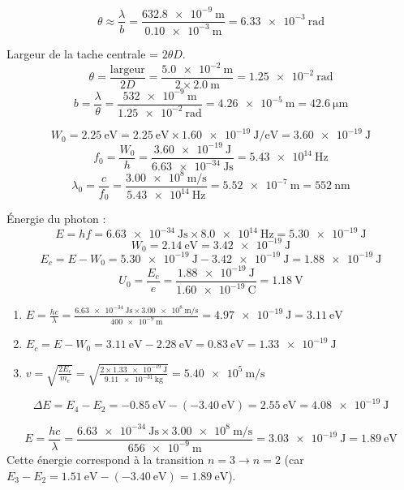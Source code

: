 \[
\theta \approx \frac{\lambda}{b} = \frac{\SI{632.8e-9}{\metre}}{\SI{0.10e-3}{\metre}} = \SI{6.33e-3}{\radian}
\]

Largeur de la tache centrale = \(2 \theta D\).
\[
\theta = \frac{\text{largeur}}{2 D} = \frac{\SI{5.0e-2}{\metre}}{2 \times \SI{2.0}{\metre}} = \SI{1.25e-2}{\radian}
\]
\[
b = \frac{\lambda}{\theta} = \frac{\SI{532e-9}{\metre}}{\SI{1.25e-2}{\radian}} = \SI{4.26e-5}{\metre} = \SI{42.6}{\micro\metre}
\]

\[
W_0 = \SI{2.25}{\electronvolt} = \SI{2.25}{\electronvolt} \times \SI{1.60e-19}{\joule\per\electronvolt} = \SI{3.60e-19}{\joule}
\]
\[
f_0 = \frac{W_0}{h} = \frac{\SI{3.60e-19}{\joule}}{\SI{6.63e-34}{\joule\second}} = \SI{5.43e14}{\hertz}
\]
\[
\lambda_0 = \frac{c}{f_0} = \frac{\SI{3.00e8}{\metre\per\second}}{\SI{5.43e14}{\hertz}} = \SI{5.52e-7}{\metre} = \SI{552}{\nano\metre}
\]

Énergie du photon :
\[
E = h f = \SI{6.63e-34}{\joule\second} \times \SI{8.0e14}{\hertz} = \SI{5.30e-19}{\joule}
\]
\[
W_0 = \SI{2.14}{\electronvolt} = \SI{3.42e-19}{\joule}
\]
\[
E_c = E - W_0 = \SI{5.30e-19}{\joule} - \SI{3.42e-19}{\joule} = \SI{1.88e-19}{\joule}
\]
\[
U_0 = \frac{E_c}{e} = \frac{\SI{1.88e-19}{\joule}}{\SI{1.60e-19}{\coulomb}} = \SI{1.18}{\volt}
\]

\begin{enumerate}
  \item \(E = \frac{h c}{\lambda} = \frac{\SI{6.63e-34}{\joule\second} \times \SI{3.00e8}{\metre\per\second}}{\SI{400e-9}{\metre}} = \SI{4.97e-19}{\joule} = \SI{3.11}{\electronvolt}\)
  \item \(E_c = E - W_0 = \SI{3.11}{\electronvolt} - \SI{2.28}{\electronvolt} = \SI{0.83}{\electronvolt} = \SI{1.33e-19}{\joule}\)
  \item \(v = \sqrt{\frac{2 E_c}{m_e}} = \sqrt{\frac{2 \times \SI{1.33e-19}{\joule}}{\SI{9.11e-31}{\kilogram}}} = \SI{5.40e5}{\metre\per\second}\)
\end{enumerate}

\[
\Delta E = E_4 - E_2 = \SI{-0.85}{\electronvolt} - (\SI{-3.40}{\electronvolt}) = \SI{2.55}{\electronvolt} = \SI{4.08e-19}{\joule}
\]

\[
E = \frac{h c}{\lambda} = \frac{\SI{6.63e-34}{\joule\second} \times \SI{3.00e8}{\metre\per\second}}{\SI{656e-9}{\metre}} = \SI{3.03e-19}{\joule} = \SI{1.89}{\electronvolt}
\]
Cette énergie correspond à la transition \(n=3 \to n=2\) (car \(E_3 - E_2 = \SI{1.51}{\electronvolt} - (\SI{-3.40}{\electronvolt}) = \SI{1.89}{\electronvolt}\)).

